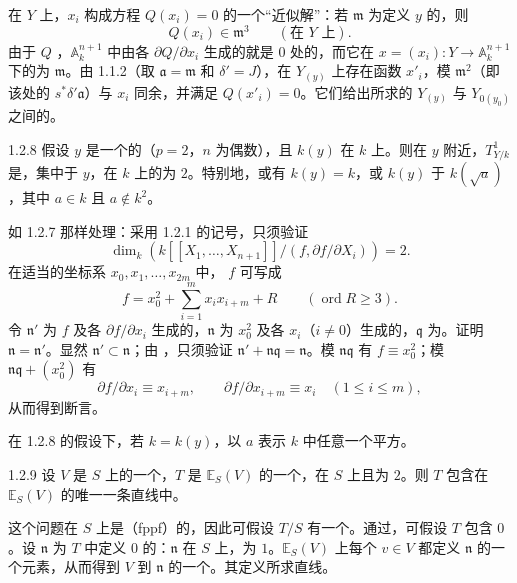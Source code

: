 在 $Y$ 上，$x_i$ 构成方程 $Q(x_i)=0$ 的一个“近似解”：若 $\mathfrak m$ 为定义 $y$ 的，则
\[
 Q(x_i)\in\mathfrak m^3\qquad(\text{在 }Y\text{ 上}).
\]
由于 $Q$ ，$\mathbb A_k^{n+1}$ 中由各 $\partial Q/\partial x_i$ 生成的就是 $0$ 处的，而它在 $x=(x_i):Y\to\mathbb A_k^{n+1}$ 下的为 $\mathfrak m$。由 1.1.2（取 $\mathfrak a=\mathfrak m$ 和 $\delta'=J$），在 $Y_{(y)}$ 上存在函数 $x'_i$，模 $\mathfrak m^2$（即该处的 $s^*\delta'\mathfrak a$）与 $x_i$ 同余，并满足 $Q(x'_i)=0$。它们给出所求的 $Y_{(y)}$ 与 $Y_{0(y_0)}$ 之间的。
\begin{SGAresult}{}{1.2.8}
假设 $y$ 是一个的（$p=2$，$n$ 为偶数），且 $k(y)$ 在 $k$ 上。则在 $y$ 附近，$T^1_{Y/k}$ 是，集中于 $y$，在 $k$ 上的为 $2$。特别地，或有 $k(y)=k$，或 $k(y)$ 于 $k(\sqrt a)$，其中 $a\in k$ 且 $a\notin k^2$。
\end{SGAresult}
如 1.2.7 那样处理：采用 1.2.1 的记号，只须验证
\[
 \dim_k\left(k[[X_1,\ldots,X_{n+1}]]/(f,\partial f/\partial X_i)\right)=2.
\]
在适当的坐标系 $x_0,x_1,\ldots,x_{2m}$ 中， $f$ 可写成
\[
 f=x_0^2+\sum_{i=1}^m x_i x_{i+m}+R\qquad(\operatorname{ord}R\geq3).
\]
令 $\mathfrak n'$ 为 $f$ 及各 $\partial f/\partial x_i$ 生成的，$\mathfrak n$ 为 $x_0^2$ 及各 $x_i$（$i\ne0$）生成的，$\mathfrak q$ 为。证明 $\mathfrak n=\mathfrak n'$。显然 $\mathfrak n'\subset\mathfrak n$；由 ，只须验证 $\mathfrak n'+\mathfrak n\mathfrak q=\mathfrak n$。模 $\mathfrak n\mathfrak q$ 有 $f\equiv x_0^2$；模 $\mathfrak n\mathfrak q+(x_0^2)$ 有
\[
 \partial f/\partial x_i\equiv x_{i+m},\qquad
 \partial f/\partial x_{i+m}\equiv x_i\quad(1\leq i\leq m),
\]
从而得到断言。

在 1.2.8 的假设下，若 $k=k(y)$，以 $a$ 表示 $k$ 中任意一个平方。
\begin{SGAresult}{}{1.2.9}
设 $V$ 是 $S$ 上的一个，$T$ 是 $\mathbb E_S(V)$ 的一个，在 $S$ 上且为 $2$。则 $T$ 包含在 $\mathbb E_S(V)$ 的唯一一条直线中。
\end{SGAresult}
这个问题在 $S$ 上是（fppf）的，因此可假设 $T/S$ 有一个。通过，可假设 $T$ 包含 $0$ 。设 $\mathfrak n$ 为 $T$ 中定义 $0$ 的：$\mathfrak n$ 在 $S$ 上，为 $1$。$\mathbb E_S(V)$ 上每个 $v\in V$ 都定义 $\mathfrak n$ 的一个元素，从而得到 $V$ 到 $\mathfrak n$ 的一个。其定义所求直线。

